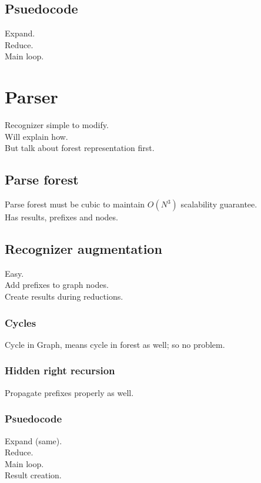 \documentclass[a4paper,10pt]{article}
\begin{document}
\subsection{Psuedocode}

Expand.\\
Reduce.\\
Main loop.

\section{Parser}

Recognizer simple to modify.\\
Will explain how.\\
But talk about forest representation first.

\subsection{Parse forest}

Parse forest must be cubic to maintain $O(N^3)$ scalability guarantee.\\
Has results, prefixes and nodes.

\subsection{Recognizer augmentation}

Easy.\\
Add prefixes to graph nodes.\\
Create results during reductions.

\subsubsection{Cycles}

Cycle in Graph, means cycle in forest as well; so no problem.

\subsubsection{Hidden right recursion}

Propagate prefixes properly as well.

\subsubsection{Psuedocode}

Expand (same).\\
Reduce.\\
Main loop.\\
Result creation.
\end{document}
